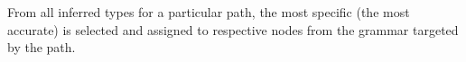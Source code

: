 %
%
%

From all inferred types for a particular path, the most specific (the most accurate) is selected and assigned to respective nodes from the grammar targeted by the path.